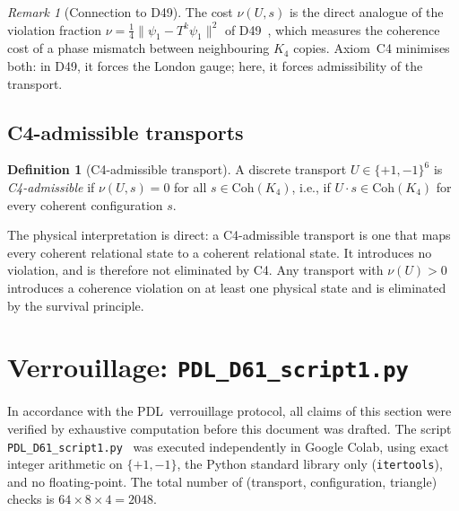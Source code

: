 \documentclass[11pt,a4paper]{article}
\theoremstyle{plain}
\theoremstyle{definition}
\newtheorem{definition}[theorem]{Definition}
\theoremstyle{remark}
\newtheorem{remark}[theorem]{Remark}
\newcommand{\PDL}{\textsc{PDL}}
\newcommand{\Kfour}{K_4}
\newcommand{\Coh}{\mathrm{Coh}(K_4)}
\begin{document}
\begin{remark}[Connection to D49]
The cost $\nu(U, s)$ is the direct analogue of the violation fraction
$\nu = \frac{1}{4}\|\psi_1 - T^k\psi_1\|^2$ of D49~\cite{PDL_D49}, which measures
the coherence cost of a phase mismatch between neighbouring $\Kfour$ copies.
Axiom~C4 minimises both: in D49, it forces the London gauge; here, it forces
admissibility of the transport.
\end{remark}

\subsection{C4-admissible transports}

\begin{definition}[C4-admissible transport]
\label{def:admissible}
A discrete transport $U \in \{+1,-1\}^6$ is \emph{C4-admissible} if
$\nu(U, s) = 0$ for all $s \in \Coh$, i.e., if $U \cdot s \in \Coh$ for every
coherent configuration $s$.
\end{definition}

The physical interpretation is direct: a C4-admissible transport is one that maps
every coherent relational state to a coherent relational state. It introduces no
violation, and is therefore not eliminated by C4. Any transport with $\nu(U) > 0$
introduces a coherence violation on at least one physical state and is eliminated
by the survival principle.

\section{Verrouillage: \texttt{PDL\_D61\_script1.py}}
\label{sec:script1}

In accordance with the \PDL\ verrouillage protocol, all claims of this section were
verified by exhaustive computation before this document was drafted. The script
\texttt{PDL\_D61\_script1.py}~\cite{PDL_D61_script1} was executed independently in
Google Colab, using exact integer arithmetic on $\{+1,-1\}$, the Python standard
library only (\texttt{itertools}), and no floating-point. The total number of
(transport, configuration, triangle) checks is $64 \times 8 \times 4 = 2048$.
\end{document}
